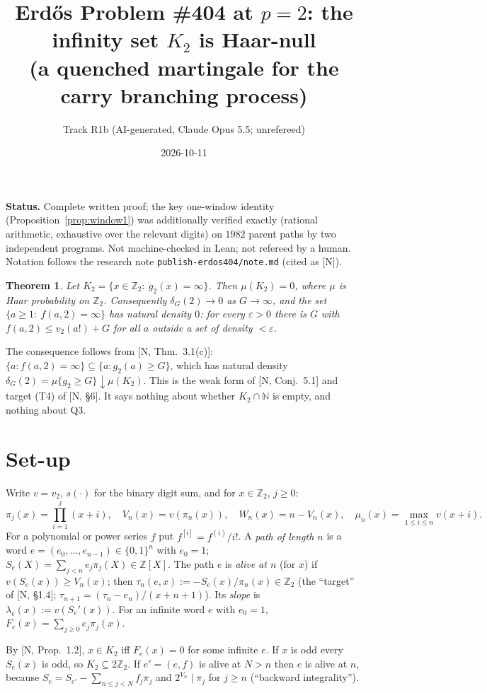 \documentclass[11pt]{amsart}
\title[$\mu(K_2)=0$]{Erd\H{o}s Problem \#404 at $p=2$: the infinity set $K_2$ is Haar-null\\
(a quenched martingale for the carry branching process)}
\author{Track R1b (AI-generated, Claude Opus 5.5; unrefereed)}
\date{2026-10-11}
\newtheorem{theorem}{Theorem}
\theoremstyle{definition}
\newcommand{\Z}{\mathbb Z}
\newcommand{\N}{\mathbb N}
\begin{document}
\maketitle

\noindent\textbf{Status.} Complete written proof; the key one-window identity (Proposition~\ref{prop:window1})
was additionally verified exactly (rational arithmetic, exhaustive over the relevant digits) on
$1982$ parent paths by two independent programs. Not machine-checked in Lean; not refereed by a human.
Notation follows the research note \texttt{publish-erdos404/note.md} (cited as [N]).

\begin{theorem}\label{thm:main}
Let $K_2=\{x\in\Z_2:\ g_2(x)=\infty\}$. Then $\mu(K_2)=0$, where $\mu$ is Haar probability on $\Z_2$.
Consequently $\delta_G(2)\to0$ as $G\to\infty$, and the set $\{a\ge1:\ f(a,2)=\infty\}$ has natural density $0$:
for every $\varepsilon>0$ there is $G$ with $f(a,2)\le v_2(a!)+G$ for all $a$ outside a set of density $<\varepsilon$.
\end{theorem}

The consequence follows from [N, Thm.~3.1(c)]: $\{a: f(a,2)=\infty\}\subseteq\{a:g_2(a)\ge G\}$, which has
natural density $\delta_G(2)=\mu\{g_2\ge G\}\downarrow\mu(K_2)$. This is the weak form of [N, Conj.~5.1] and target (T4) of [N, \S6].
It says nothing about whether $K_2\cap\N$ is empty, and nothing about Q3.

\section{Set-up}
Write $v=v_2$, $s(\cdot)$ for the binary digit sum, and for $x\in\Z_2$, $j\ge0$:
\[
\pi_j(x)=\prod_{i=1}^{j}(x+i),\quad V_n(x)=v(\pi_n(x)),\quad W_n(x)=n-V_n(x),\quad \mu_n(x)=\max_{1\le i\le n}v(x+i).
\]
For a polynomial or power series $f$ put $f^{[i]}=f^{(i)}/i!$. A \emph{path of length $n$} is a word
$e=(e_0,\dots,e_{n-1})\in\{0,1\}^n$ with $e_0=1$; $S_e(X)=\sum_{j<n}e_j\pi_j(X)\in\Z[X]$. The path $e$ is
\emph{alive at $n$} (for $x$) if $v(S_e(x))\ge V_n(x)$; then $\tau_n(e,x):=-S_e(x)/\pi_n(x)\in\Z_2$ (the
``target'' of [N, \S1.4]; $\tau_{n+1}=(\tau_n-e_n)/(x+n+1)$). Its \emph{slope} is $\lambda_e(x):=v(S_e'(x))$.
For an infinite word $e$ with $e_0=1$, $F_e(x)=\sum_{j\ge0}e_j\pi_j(x)$.

By [N, Prop.~1.2], $x\in K_2$ iff $F_e(x)=0$ for some infinite $e$. If $x$ is odd every $S_e(x)$ is odd, so
$K_2\subseteq2\Z_2$. If $e'=(e,f)$ is alive at $N>n$ then $e$ is alive at $n$, because
$S_e=S_{e'}-\sum_{n\le j<N}f_j\pi_j$ and $2^{V_n}\mid\pi_j$ for $j\ge n$ (``backward integrality'').
\end{document}
